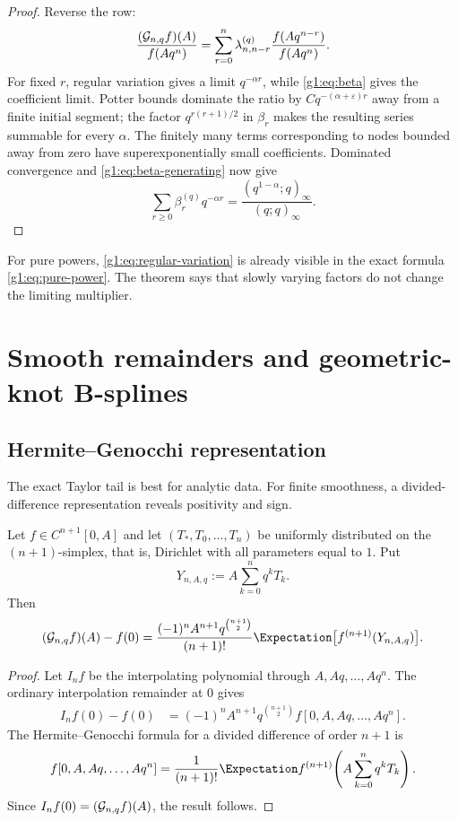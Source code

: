 \begin{proof}
Reverse the row:
\[
 \frac{(\mathcal G_{n,q}f)(A)}{f(Aq^n)}
 =\sum_{r=0}^n\lambda_{n,n-r}^{(q)}
   \frac{f(Aq^{n-r})}{f(Aq^n)}.
\]
For fixed $r$, regular variation gives a limit $q^{-\alpha r}$, while
\eqref{g1:eq:beta} gives the coefficient limit.  Potter bounds dominate the
ratio by $Cq^{-(\alpha+\varepsilon)r}$ away from a finite initial segment; the
factor $q^{r(r+1)/2}$ in $\beta_r$ makes the resulting series summable for every
$\alpha$.  The finitely many terms corresponding to nodes bounded away from
zero have superexponentially small coefficients.  Dominated convergence and
\eqref{g1:eq:beta-generating} now give
\[
 \sum_{r\ge0}\beta_r^{(q)}q^{-\alpha r}
 =\frac{(q^{1-\alpha};q)_\infty}{(q;q)_\infty}.
\]
\end{proof}

For pure powers, \eqref{g1:eq:regular-variation} is already visible in the exact
formula \eqref{g1:eq:pure-power}.  The theorem says that slowly varying factors do
not change the limiting multiplier.

\section{Smooth remainders and geometric-knot B-splines}
\label{g1:sec:bspline}

\subsection{Hermite--Genocchi representation}

The exact Taylor tail is best for analytic data.  For finite smoothness, a
divided-difference representation reveals positivity and sign.

\begin{theorem}
Let $f\in C^{n+1}[0,A]$ and let
$(T_*,T_0,\ldots,T_n)$ be uniformly distributed on the $(n+1)$-simplex,
that is, Dirichlet with all parameters equal to $1$.  Put
\begin{equation}
 Y_{n,A,q}:=A\sum_{k=0}^nq^kT_k.
 \label{g1:eq:Y-dirichlet}
\end{equation}
Then
\begin{equation}
 (\Gc_{n,q}f)(A)-f(0)
 =\frac{(-1)^nA^{n+1}q^{\binom{n+1}{2}}}{(n+1)!}
 \Expectation\bigl[f^{(n+1)}(Y_{n,A,q})\bigr].
 \label{g1:eq:HG-remainder}
\end{equation}
\end{theorem}

\begin{proof}
Let $I_nf$ be the interpolating polynomial through $A,Aq,\ldots,Aq^n$.
The ordinary interpolation remainder at $0$ gives
\begin{align*}
 I_nf(0)-f(0)
 &=(-1)^nA^{n+1}q^{\binom{n+1}{2}}
 f[0,A,Aq,\ldots,Aq^n].
\end{align*}
The Hermite--Genocchi formula for a divided difference of order $n+1$ is
\[
 f[0,A,Aq,\ldots,Aq^n]
 =\frac1{(n+1)!}
 \Expectation f^{(n+1)}\!\left(A\sum_{k=0}^nq^kT_k\right).
\]
Since $I_nf(0)=(\mathcal G_{n,q}f)(A)$, the result follows.
\end{proof}

